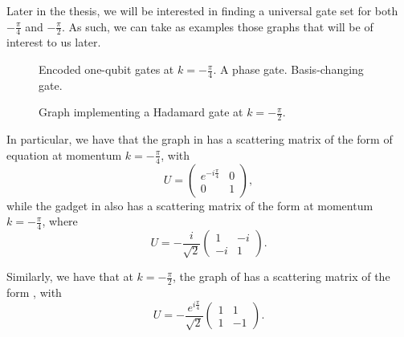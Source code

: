\documentclass[../thesis-main/thesis-main]{subfiles}
\begin{document}
Later in the thesis, we will be interested in finding a universal gate set for both $-\frac{\pi}{4}$ and $-\frac{\pi}{2}$.  As such, we can take as examples those graphs that will be of interest to us later.   


\begin{figure}
  \centering
  \qquad
   \caption{Encoded one-qubit gates at $k = -\frac{\pi}{4}$.    A phase gate.    Basis-changing gate.}
   \label{fig:reversal}
\end{figure}

\begin{figure}
  \centering
  
  \caption{Graph implementing a Hadamard gate at $k = -\frac{\pi}{2}$.
    \label{fig:pi_2_had}}
\end{figure}


In particular, we have that the graph in  has a scattering matrix of the form of equation  at momentum $k= -\frac{\pi}{4}$, with 
\begin{equation}
  U = \begin{pmatrix}
    e^{- i \frac{\pi}{4}} & 0\\
    0 & 1 
  \end{pmatrix},
\end{equation}
while the gadget in  also has a scattering matrix of the form  at momentum $k=-\frac{\pi}{4}$, where
\begin{equation}
  U = -\frac{i}{\sqrt{2}}\begin{pmatrix}
    1 & -i\\
    -i & 1 
  \end{pmatrix}.
\end{equation}

Similarly, we have that at $k = -\frac{\pi}{2}$, the graph of  has a scattering matrix of the form , with
\begin{equation}
  U = -\frac{e^{i \frac{\pi}{4}}}{\sqrt{2}}\begin{pmatrix}
    1 & 1\\
    1 & -1 
  \end{pmatrix}.
\end{equation}
\end{document}
